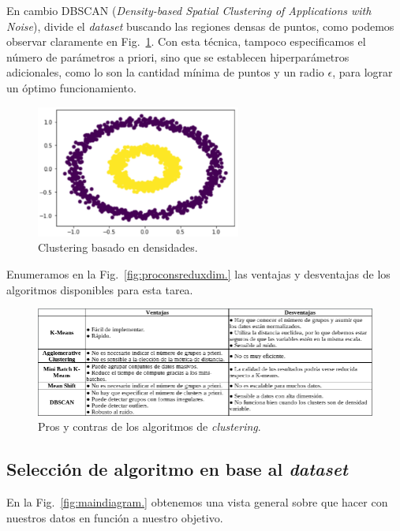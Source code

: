 \documentclass[a4paper,12pt]{article}
\begin{document}
En cambio DBSCAN (\textit{Density-based Spatial Clustering of Applications with Noise}), divide el \textit{dataset} buscando las regiones densas de puntos, como podemos observar claramente en Fig.~\ref{fig:DBSCAN.}. Con esta técnica, tampoco especificamos el número de parámetros a priori, sino que se establecen hiperparámetros adicionales, como lo son la cantidad mínima de puntos y un radio $\epsilon$, para lograr un óptimo funcionamiento.

\begin{figure}[H]
	\begin{center}				
	\includegraphics[width=0.6\textwidth]{tesis_17.png}
  	\caption{Clustering basado en densidades.}
  	\label{fig:DBSCAN.}
  	\end{center}
\end{figure}

Enumeramos en la Fig.~\ref{fig:proconsreduxdim.} las ventajas y desventajas de los algoritmos disponibles para esta tarea.

\begin{figure}[H]
	\begin{center}				
	\includegraphics[width=1\textwidth]{tesis_34.png}
  	\caption{Pros y contras de los algoritmos de \textit{clustering}.}
  	\label{fig:proconsclustering.}
  	\end{center}
\end{figure}

\subsection{Selección de algoritmo en base al \textit{dataset}}
En la Fig.~\ref{fig:maindiagram.} obtenemos una vista general sobre que hacer con nuestros datos en función a nuestro objetivo.
\end{document}
